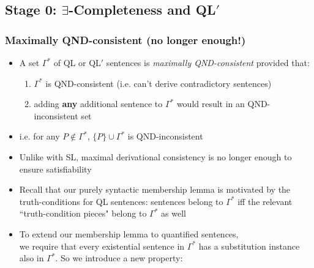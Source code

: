 
\subsection{Stage 0: $\exists$-Completeness and QL$'$}

\begin{frame}
\frametitle{Maximally QND-consistent (no longer enough!)}

\begin{itemize}[<+->]

\item A set $\Gamma^{\ast}$ of QL or QL$'$ sentences is \emph{maximally QND-consistent} provided that:

\begin{enumerate}[1.)]

\item $\Gamma^{\ast}$ is QND-consistent (i.e. can't derive contradictory sentences)

\item adding \textbf{any} additional sentence to $\Gamma^{\ast}$ would result in an QND-\textcolor{OGlyallpink}{inconsistent} set

\end{enumerate} 

\item i.e. for any $P \notin \Gamma^{\ast}$, $\{P\} \cup \Gamma^{\ast}$ is QND-\textcolor{OGlyallpink}{inconsistent}

\item Unlike with SL, maximal derivational consistency is no longer enough to ensure satisfiability

\item \small{Recall that our purely syntactic membership lemma is motivated by the truth-conditions for QL sentences: sentences belong to $\Gamma^{\ast}$ iff the relevant ``truth-condition pieces" belong to $\Gamma^{\ast}$ as well} 

\item  \small{To extend our membership lemma to quantified sentences, \\ we require that every existential sentence in $\Gamma^{\ast}$ has a substitution instance also in $\Gamma^{\ast}$. So we introduce a new property}:



\end{itemize}
\end{frame}
